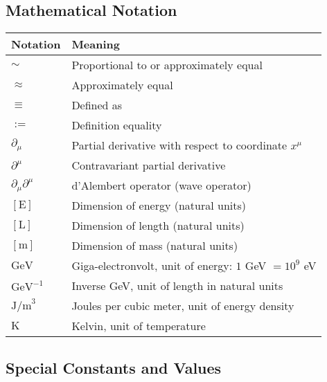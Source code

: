 \documentclass[12pt,a4paper]{article}
\numberwithin{equation}{section}
\begin{document}
\subsection*{Mathematical Notation}

\begin{longtable}{p{2cm} p{12cm}}
	\toprule
	\textbf{Notation} & \textbf{Meaning} \\
	\midrule
	\endhead
	
	$\sim$ & Proportional to or approximately equal \\
	$\approx$ & Approximately equal \\
	$\equiv$ & Defined as \\
	$:=$ & Definition equality \\
	$\partial_\mu$ & Partial derivative with respect to coordinate $x^\mu$ \\
	$\partial^\mu$ & Contravariant partial derivative \\
	$\partial_\mu \partial^\mu$ & d'Alembert operator (wave operator) \\
	$[\text{E}]$ & Dimension of energy (natural units) \\
	$[\text{L}]$ & Dimension of length (natural units) \\
	$[\text{m}]$ & Dimension of mass (natural units) \\
	$\text{GeV}$ & Giga-electronvolt, unit of energy: $1$ GeV $= 10^9$ eV \\
	$\text{GeV}^{-1}$ & Inverse GeV, unit of length in natural units \\
	$\text{J/m}^3$ & Joules per cubic meter, unit of energy density \\
	$\text{K}$ & Kelvin, unit of temperature \\
	\bottomrule
\end{longtable}

\subsection*{Special Constants and Values}
\end{document}
